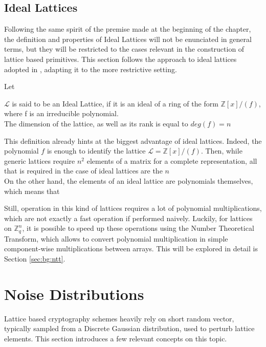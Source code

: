 \subsection{Ideal Lattices}\label{sec:bg:ideal}

Following the same spirit of the premise made at the beginning of the chapter, the definition and properties of Ideal Lattices will not be enunciated in general terms, but they will be restricted to the cases relevant in the construction of lattice based primitives. This section follows the approach to ideal lattices adopted in \cite{ideal_lattices}, adapting it to the more restrictive setting.

\begin{definition}
Let 
\end{definition}

\begin{definition}
$\mathscr{L}$ is said to be an Ideal Lattice, if it is an ideal of a ring of the form $\mathbb{Z}[x]/(f)$, where f is an irreducible polynomial.\\
The dimension of the lattice, as well as its rank is equal to $deg(f)=n$
\end{definition}

This definition already hints at the biggest advantage of ideal lattices. Indeed, the polynomial $f$ is enough to identify the lattice $\mathscr{L}=\mathbb{Z}[x]/(f)$. Then, while generic lattices require $n^2$ elements of a matrix for a complete representation, all that is required in the case of ideal lattices are the $n$\\
On the other hand, the elements of an ideal lattice are polynomials themselves, which means that 

Still, operation in this kind of lattices requires a lot of polynomial multiplications, which are not exactly a fast operation if performed naively. Luckily, for lattices on $\mathbb{Z}_q^n$, it is possible to speed up these operations using the Number Theoretical Transform, which allows to convert polynomial multiplication in simple component-wise multiplications between arrays. This will be explored in detail is Section \ref{sec:bg:ntt}.

\section{Noise Distributions}
Lattice based cryptography schemes heavily rely on short random vector, typically sampled from a Discrete Gaussian distribution, used to perturb lattice elements. This section introduces a few relevant concepts on this topic.\\

